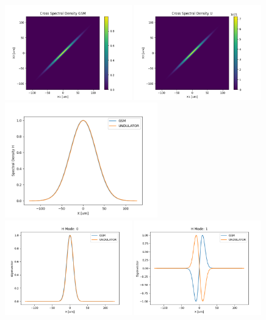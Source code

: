 \documentclass{iucr}              %
\begin{document}
\begin{figure}
    \centering
    \includegraphics[width=0.49\textwidth]{figures/comparison_H_CSD_GSM.png}
    \includegraphics[width=0.49\textwidth]{figures/comparison_H_CSD_U.png}
    \includegraphics[width=0.59\textwidth]{figures/comparison_H_SD.png}
    \includegraphics[width=0.49\textwidth]{figures/comparison_H_eigenvector0.png}
    \includegraphics[width=0.49\textwidth]{figures/comparison_H_eigenvector1.png}

\end{figure}
\end{document}
